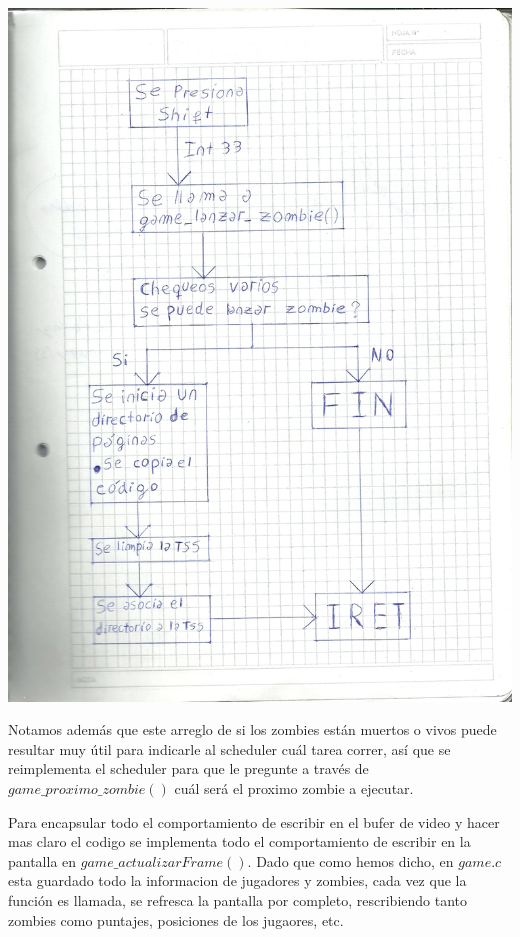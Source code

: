 \documentclass[a4paper]{article}
\begin{document}
\includegraphics[scale=0.2]{dibujos/dibujo1.jpg}\\
\newpage

Notamos además que este arreglo de si los zombies están muertos o vivos puede resultar muy útil para indicarle al scheduler cuál tarea correr, así que se reimplementa el scheduler para que le pregunte a través de $game\_ proximo\_ zombie()$ cuál será el proximo zombie a ejecutar.

Para encapsular todo el comportamiento de escribir en el bufer de video y hacer mas claro el codigo se implementa todo el comportamiento de escribir en la pantalla en $game\_actualizarFrame()$. Dado que como hemos dicho, en $game.c$ esta guardado todo la informacion de jugadores y zombies, cada vez que la función es llamada, se refresca la pantalla por completo, rescribiendo tanto zombies como puntajes, posiciones de los jugaores, etc.
\end{document}
